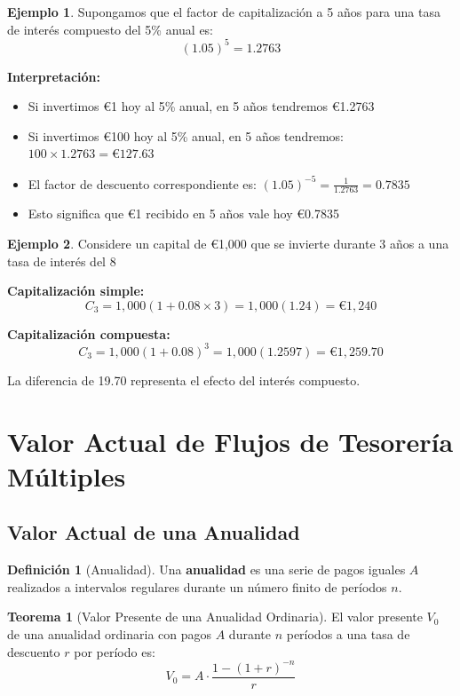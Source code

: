 \documentclass[12pt,a4paper]{article}
\theoremstyle{definition}
\newtheorem{definicion}{Definición}[section]
\newtheorem{teorema}{Teorema}[section]
\newtheorem{ejemplo}{Ejemplo}[section]
\begin{document}
\begin{ejemplo}
Supongamos que el factor de capitalización a 5 años para una tasa de interés compuesto del 5\% anual es:
$$(1.05)^5 = 1.2763$$

\textbf{Interpretación:}
\begin{itemize}
\item Si invertimos €1 hoy al 5\% anual, en 5 años tendremos €1.2763
\item Si invertimos €100 hoy al 5\% anual, en 5 años tendremos: $100 \times 1.2763 = \text{€}127.63$
\item El factor de descuento correspondiente es: $(1.05)^{-5} = \frac{1}{1.2763} = 0.7835$
\item Esto significa que €1 recibido en 5 años vale hoy €0.7835
\end{itemize}
\end{ejemplo}

\begin{ejemplo}
Considere un capital de €1,000 que se invierte durante 3 años a una tasa de interés del 8%

\textbf{Capitalización simple:}
$$C_3 = 1{,}000(1 + 0.08 \times 3) = 1{,}000(1.24) = \text{€}1{,}240$$

\textbf{Capitalización compuesta:}
$$C_3 = 1{,}000(1 + 0.08)^3 = 1{,}000(1.2597) = \text{€}1{,}259.70$$

La diferencia de 19.70 representa el efecto del interés compuesto.
\end{ejemplo}

\section{Valor Actual de Flujos de Tesorería Múltiples}

\subsection{Valor Actual de una Anualidad}

\begin{definicion}[Anualidad]
Una \textbf{anualidad} es una serie de pagos iguales $A$ realizados a intervalos regulares durante un número finito de períodos $n$.
\end{definicion}

\begin{teorema}[Valor Presente de una Anualidad Ordinaria]
El valor presente $V_0$ de una anualidad ordinaria con pagos $A$ durante $n$ períodos a una tasa de descuento $r$ por período es:
\begin{equation}
V_0 = A \cdot \frac{1 - (1 + r)^{-n}}{r}
\end{equation}
\end{teorema}
\end{document}
